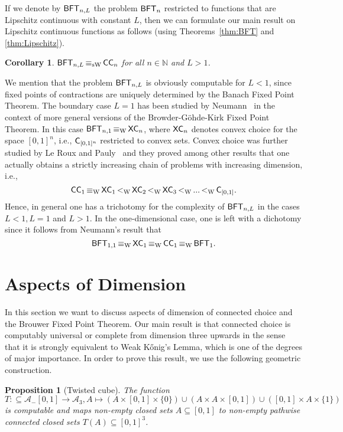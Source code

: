 \documentclass[a4paper]{amsart}
\def\AA{{\mathcal A}}
\def\IN{{\mathbb{N}}}
\def\In{\subseteq}
\def\BFT{\mbox{\rm\sffamily BFT}}
\def\C{\mbox{\rm\sffamily C}}
\def\ConC{\mbox{\rm\sffamily CC}}
\def\XC{\text{\rm\sffamily XC}}
\def\equivW{\mathop{\equiv_{\mathrm{W}}}}
\def\equivSW{\mathop{\equiv_{\mathrm{sW}}}}
\def\lW{\mathop{<_{\mathrm{W}}}}
\newtheorem{proposition}[theorem]{Proposition}
\newtheorem{corollary}[theorem]{Corollary}
\theoremstyle{definition}
\begin{document}
If we denote by $\BFT_{n,L}$ the problem $\BFT_n$ restricted to functions that are Lip\-schitz continuous with constant $L$, 
then we can formulate our main result on Lip\-schitz continuous functions as follows (using Theorems~\ref{thm:BFT} and \ref{thm:Lipschitz}).

\begin{corollary}
$\BFT_{n,L}\equivSW\ConC_n$ for all $n\in\IN$ and $L>1$.
\end{corollary}

We mention that the problem $\BFT_{n,L}$ is obviously computable for $L<1$,
since fixed points of contractions are uniquely determined by the Banach Fixed Point Theorem.
The boundary case $L=1$ has been studied by Neumann~\cite[Theorem~5.8]{Neu15} in the context of more general versions of the Browder-G\"ohde-Kirk Fixed Point Theorem.
In this case $\BFT_{n,1}\equivW\XC_n$, where $\XC_n$ denotes convex choice for the space $[0,1]^n$, 
i.e., $\C_{[0,1]^n}$ restricted to convex sets. Convex choice was further studied by Le Roux and Pauly~\cite[Corollary~3.31]{LRP15a} and they proved
among other results that one actually obtains a strictly increasing chain of problems with increasing dimension, i.e., 
\[\ConC_1\equivW\XC_1\lW\XC_2\lW\XC_3\lW...\lW \C_{[0,1]}.\]
Hence, in general one has a trichotomy for the complexity of $\BFT_{n,L}$ in the cases $L<1, L=1$ and $L>1$.
In the one-dimensional case, one is left with a dichotomy since it follows from Neumann's result that 
\[\BFT_{1,1}\equivW\XC_1\equivW\ConC_1\equivW\BFT_1.\]


\section{Aspects of Dimension}
\label{sec:dimension}

In this section we want to discuss aspects of dimension of connected choice and the Brouwer Fixed Point Theorem.
Our main result is that connected choice is computably universal or complete from dimension three upwards 
in the sense that it is strongly equivalent to Weak K\H{o}nig's Lemma, which is one of the degrees of major importance.
In order to prove this result, we use the following geometric construction.

\begin{proposition}[Twisted cube]
\label{prop:twisted-cube}
The function 
\[T:\In\AA_-[0,1]\to\AA_3,A\mapsto(A\times[0,1]\times\{0\})\cup(A\times A\times[0,1])\cup([0,1]\times A\times\{1\})\]
is computable and maps non-empty closed sets $A\In[0,1]$
to non-empty pathwise connected closed sets $T(A)\In[0,1]^3$.
\end{proposition}
\end{document}
